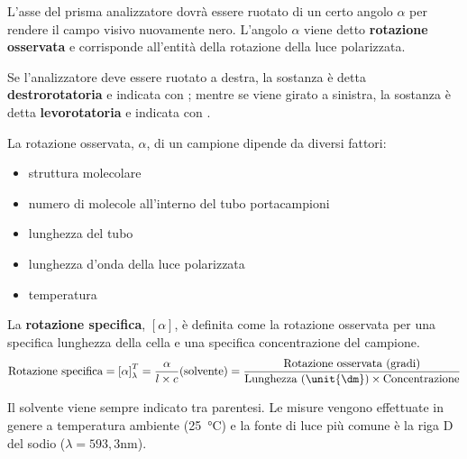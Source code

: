L'asse del prisma analizzatore dovrà essere ruotato di un certo angolo \(\alpha\) per rendere il campo visivo nuovamente nero.
L'angolo \(\alpha\) viene detto \textbf{rotazione osservata} e corrisponde all'entità della rotazione della luce polarizzata.

Se l'analizzatore deve essere ruotato a destra, la sostanza è detta \textbf{destrorotatoria} e indicata con \iupac{(+)}; mentre se viene girato a sinistra, la sostanza è detta \textbf{levorotatoria} e indicata con \iupac{($-$)}.


La rotazione osservata, \(\alpha\), di un campione dipende da diversi fattori:
\begin{itemize}
	\item struttura molecolare
	\item numero di molecole all'interno del tubo portacampioni
	\item lunghezza del tubo
	\item lunghezza d'onda della luce polarizzata
	\item temperatura
\end{itemize}

La \textbf{rotazione specifica}, \(\left[\alpha\right]\), è definita come la rotazione osservata per una specifica lunghezza della cella e una specifica concentrazione del campione.
\begin{equation*}
	\text{Rotazione specifica} = \left[\alpha\right]^{T}_{\lambda} = \frac{\alpha}{l\times c} (\text{solvente}) = \frac{\text{Rotazione osservata (gradi)}}{\text{Lunghezza (\unit{\dm})} \times \text{Concentrazione}}
\end{equation*}

Il solvente viene sempre indicato tra parentesi. Le misure vengono effettuate in genere a temperatura ambiente (\unit{25\celsius}) e la fonte di luce più comune è la riga D del sodio (\(\lambda = \unit{593,3\nm}\)).


